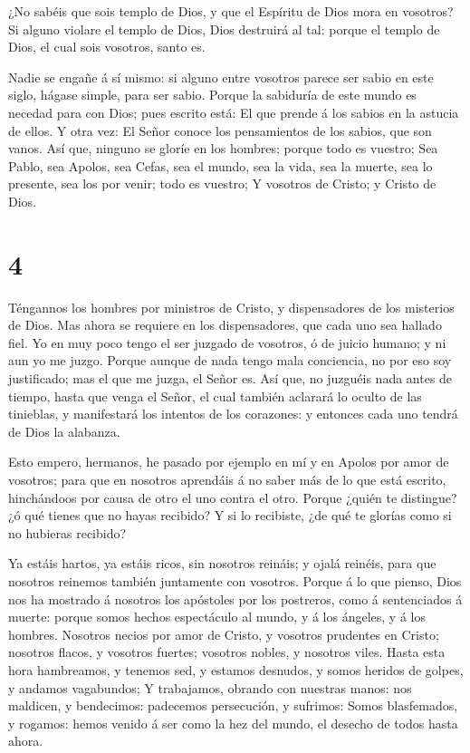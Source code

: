  ¿No sabéis que sois templo de Dios, y que el Espíritu de
Dios mora en vosotros?  Si alguno violare el templo de
Dios, Dios destruirá al tal: porque el templo de Dios, el cual sois
vosotros, santo es.

 Nadie se engañe á sí mismo: si alguno entre vosotros
parece ser sabio en este siglo, hágase simple, para ser sabio.
 Porque la sabiduría de este mundo es necedad para con
Dios; pues escrito está: El que prende á los sabios en la astucia de
ellos.  Y otra vez: El Señor conoce los pensamientos de los
sabios, que son vanos.  Así que, ninguno se gloríe en los
hombres; porque todo es vuestro;  Sea Pablo, sea Apolos,
sea Cefas, sea el mundo, sea la vida, sea la muerte, sea lo presente,
sea los por venir; todo es vuestro;  Y vosotros de Cristo;
y Cristo de Dios.

\hypertarget{section-3}{%
\section{4}\label{section-3}}

 Téngannos los hombres por ministros de Cristo, y
dispensadores de los misterios de Dios.  Mas ahora se
requiere en los dispensadores, que cada uno sea hallado fiel.
 Yo en muy poco tengo el ser juzgado de vosotros, ó de
juicio humano; y ni aun yo me juzgo.  Porque aunque de nada
tengo mala conciencia, no por eso soy justificado; mas el que me juzga,
el Señor es.  Así que, no juzguéis nada antes de tiempo,
hasta que venga el Señor, el cual también aclarará lo oculto de las
tinieblas, y manifestará los intentos de los corazones: y entonces cada
uno tendrá de Dios la alabanza.

 Esto empero, hermanos, he pasado por ejemplo en mí y en
Apolos por amor de vosotros; para que en nosotros aprendáis á no saber
más de lo que está escrito, hinchándoos por causa de otro el uno contra
el otro.  Porque ¿quién te distingue? ¿ó qué tienes que no
hayas recibido? Y si lo recibiste, ¿de qué te glorías como si no
hubieras recibido?

 Ya estáis hartos, ya estáis ricos, sin nosotros reináis; y
ojalá reinéis, para que nosotros reinemos también juntamente con
vosotros.  Porque á lo que pienso, Dios nos ha mostrado á
nosotros los apóstoles por los postreros, como á sentenciados á muerte:
porque somos hechos espectáculo al mundo, y á los ángeles, y á los
hombres.  Nosotros necios por amor de Cristo, y vosotros
prudentes en Cristo; nosotros flacos, y vosotros fuertes; vosotros
nobles, y nosotros viles.  Hasta esta hora hambreamos, y
tenemos sed, y estamos desnudos, y somos heridos de golpes, y andamos
vagabundos;  Y trabajamos, obrando con nuestras manos: nos
maldicen, y bendecimos: padecemos persecución, y sufrimos: 
Somos blasfemados, y rogamos: hemos venido á ser como la hez del mundo,
el desecho de todos hasta ahora.

